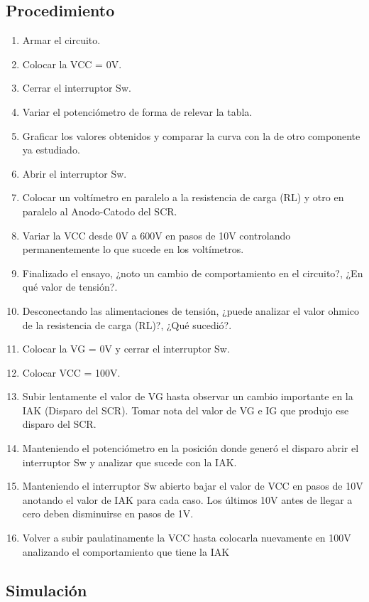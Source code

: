 \subsection{Procedimiento}
\begin{enumerate}
  \item Armar el circuito.
  \item Colocar la VCC = 0V.
  \item Cerrar el interruptor Sw.
  \item Variar el potenciómetro de forma de relevar la tabla.
  \item Graficar los valores obtenidos y comparar la curva con la de otro
    componente ya estudiado.
  \item Abrir el interruptor Sw.
  \item Colocar un voltímetro en paralelo a la resistencia de carga (RL) y otro en paralelo al Anodo-Catodo del SCR.
  \item Variar la VCC desde 0V a 600V en pasos de 10V controlando permanentemente lo que sucede en los voltímetros.
  \item Finalizado el ensayo, ¿noto un cambio de comportamiento en el circuito?, ¿En qué valor de tensión?.
  \item Desconectando las alimentaciones de tensión, ¿puede analizar el valor ohmico de la 
    resistencia de carga (RL)?, ¿Qué sucedió?.
  \item Colocar la VG = 0V y cerrar el interruptor Sw.
  \item Colocar VCC = 100V.
  \item Subir lentamente el valor de VG hasta observar un cambio importante en la IAK (Disparo del SCR). 
    Tomar nota del valor de VG e IG que produjo ese disparo del SCR.
  \item Manteniendo el potenciómetro en la posición donde generó el disparo abrir el 
    interruptor Sw y analizar que sucede con la IAK.
  \item Manteniendo el interruptor Sw abierto bajar el valor de VCC en pasos de 10V 
    anotando el valor de IAK para cada caso. Los últimos 10V antes de llegar a cero deben disminuirse en pasos de 1V.
  \item Volver a subir paulatinamente la VCC hasta colocarla nuevamente en 100V
    analizando el comportamiento que tiene la IAK
\end{enumerate}
\subsection{Simulación}

